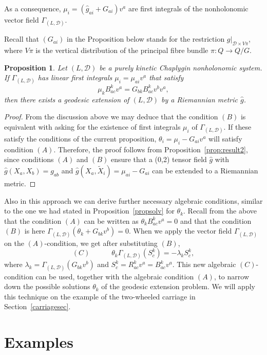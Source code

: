 \documentclass[11pt]{article}
\newtheorem{prop}{Proposition}
\def\D{{\mathcal D}}
\def\GLD{{\Gamma_{(L,\mathcal{D})}}}
\begin{document}
As a consequence, $\mu_i = (\hat{g}_{ai}+G_{ai}) v^a$ are first integrals of the nonholonomic vector field $\GLD$.



Recall that $(G_{ai})$ in the Proposition below stands for the restriction $g|_{\D \times V\pi}$, where $V\pi$ is the vertical distribution of the principal fibre bundle $\pi: Q \to Q/G$.

\begin{prop} \label{propchap} Let $(L,\D)$ be a purely kinetic Chaplygin nonholonomic system. If $\GLD$ has  linear first integrals  $\mu_i=\mu_{ai}v^a$ that satisfy
\[
\mu_k B^k_{ac} v^a = G_{bk} B^k_{ac} v^bv^a,
\] 
then there exists a geodesic extension of $(L,\D)$ by a Riemannian metric $\hat g$.
 \end{prop}

\begin{proof}
{From the discussion above we may deduce that the condition $(B)$ is equivalent with asking for the existence of  first integrals  $\mu_i$ of $\GLD$. If these satisfy the conditions of the current proposition, $\theta_i=\mu_i - G_{ai} v^a$ will satisfy condition $(A)$.
Therefore,} the proof follows from Proposition~\ref{prop:result2}, since conditions $(A)$ and $(B)$ ensure that a (0,2) tensor field ${\hat g}$ with ${\hat g}(X_a,X_b) =g_{ab}$ and ${\hat g}(X_a,{\tilde X}_i) =\mu_{ai}-G_{ai}$ can be extended to a Riemannian metric.
\end{proof}


 Also in this approach we can derive further necessary algebraic conditions, similar to the one we had stated in Proposition~\ref{propsolv} for $\theta_k$. Recall from the above that the condition $(A)$ can be written as  $\theta_k B^k_{ac}v^a=0$ and that the condition $(B)$ is here $\GLD(\theta_k+G_{bk}v^b)=0$. When we apply the vector field $\GLD$ on the $(A)$-condition, we get after substituting $(B)$,
 \[
(C) \qquad \quad    \theta_k \GLD({S}^k_c)= - \lambda_k {S}^k_c,
		\]
where ${\lambda}_k=\GLD(G_{bk}v^b)$ and ${S}^k_c=R_{ac}^k v^a = B_{ac}^k v^a$. This new algebraic $(C)$-condition can be used, together with the algebraic condition $(A)$, to narrow down the possible solutions $\theta_k$ of the geodesic extension problem. We will apply this technique on the example of the two-wheeled carriage in Section~\ref{carriagesec}.

 
\section{Examples}
 
\end{document}
